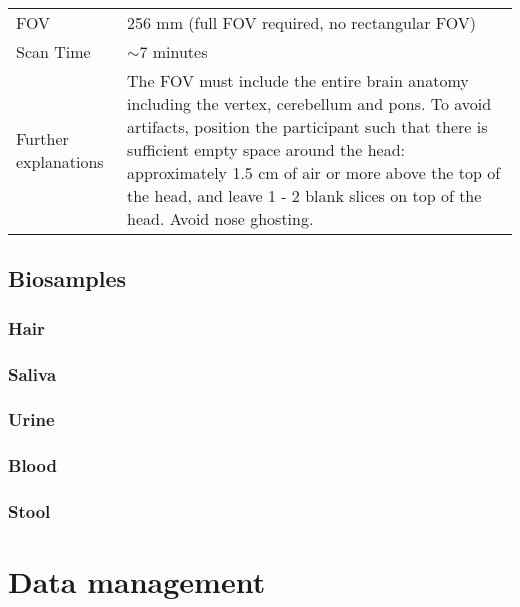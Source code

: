 \begin{table}[H]
\begin{tabularx}{\linewidth}{@{} s | X @{}}
FOV                       								& 256 mm (full FOV required, no rectangular FOV)                                            \\
Scan Time                 								& $\sim$7 minutes                                                                           \\
Further explanations      						&  The FOV must include the entire brain anatomy including the vertex, cerebellum and pons. To avoid artifacts, position the participant such that there is sufficient empty space around the head: approximately 1.5 cm of air or more above the top of the head, and leave 1 - 2 blank slices on top of the head. Avoid nose ghosting.                                                                                        
\end{tabularx}
\end{table}


\subsection{Biosamples}
\subsubsection{Hair}
\subsubsection{Saliva}
\subsubsection{Urine}
\subsubsection{Blood}
\subsubsection{Stool}


\section{Data management}

